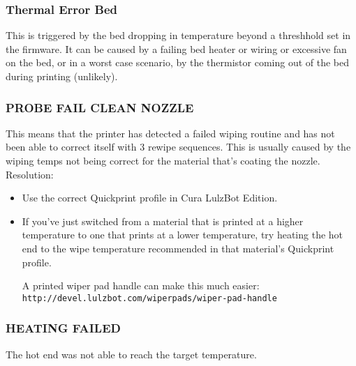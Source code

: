 \subsubsection{Thermal Error Bed}
This is triggered by the bed dropping in temperature beyond a threshhold set in the firmware. It can be caused by a failing bed heater or wiring or excessive fan on the bed, or in a worst case scenario, by the thermistor coming out of the bed during printing (unlikely).

\subsubsection{PROBE FAIL CLEAN NOZZLE}
This means that the printer has detected a failed wiping routine and has not been able to correct itself with 3 rewipe sequences. This is usually caused by the wiping temps not being correct for the material that’s coating the nozzle.
Resolution:
\begin{itemize}
\item Use the correct Quickprint profile in Cura LulzBot Edition.
\item If you’ve just switched from a material that is printed at a higher temperature to one that prints at a lower temperature, try heating the hot end to the wipe temperature recommended in that material’s Quickprint profile. 

A printed wiper pad handle can make this much easier: \texttt{http://devel.lulzbot.com/wiper\textunderscore pads/wiper-pad-handle}
\end{itemize}

\subsubsection{HEATING FAILED}
The hot end was not able to reach the target temperature.
